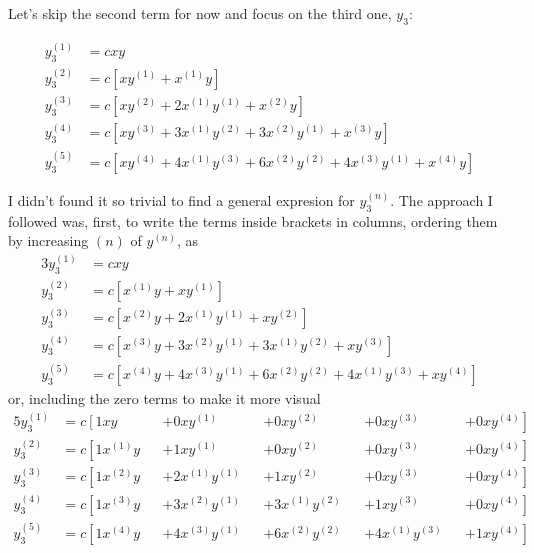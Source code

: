 \documentclass[12pt, a4paper]{article}
\begin{document}
Let's skip the second term for now and focus on the third one, $y_3$:

\begin{align*}
    y_3^{(1)} &= c x y \\
    y_3^{(2)} &= c \left[ x y^{(1)} + x^{(1)} y \right] \\
    y_3^{(3)} &= c \left[ x y^{(2)} + 2 x^{(1)} y^{(1)} + x^{(2)} y \right] \\
    y_3^{(4)} &= c \left[ x y^{(3)} + 3 x^{(1)} y^{(2)} + 3 x^{(2)} y^{(1)} + x^{(3)} y \right] \\
    y_3^{(5)} &= c \left[ x y^{(4)} + 4 x^{(1)} y^{(3)} + 6 x^{(2)} y^{(2)} + 4 x^{(3)} y^{(1)} + x^{(4)} y \right]
\end{align*}

I didn't found it so trivial to find a general expresion for $y_3^{(n)}$. The approach I followed was, first, to write the terms inside brackets in columns, ordering them by increasing $(n)$ of $y^{(n)}$, as
\begin{alignat*}{3}
    y_3^{(1)} &= c x y \\
    y_3^{(2)} &= c \left[ x^{(1)} y + x y^{(1)}  \right] \\
    y_3^{(3)} &= c \left[ x^{(2)} y + 2 x^{(1)} y^{(1)} + x y^{(2)}  \right] \\
    y_3^{(4)} &= c \left[ x^{(3)} y + 3 x^{(2)} y^{(1)} + 3 x^{(1)} y^{(2)} + x y^{(3)} \right] \\
    y_3^{(5)} &= c \left[ x^{(4)} y + 4 x^{(3)} y^{(1)} + 6 x^{(2)} y^{(2)} + 4 x^{(1)} y^{(3)} + x y^{(4)} \right]
\end{alignat*}
or, including the zero terms to make it more visual
\begin{alignat*}{5}
    y_3^{(1)} &= c \left[ 1 x y       \right. &&+ 0 x y^{(1)}       &&+ 0 x y^{(2)}       &&+ 0 x y^{(3)}       &&+ \left. 0 x y^{(4)} \right] \\
    y_3^{(2)} &= c \left[ 1 x^{(1)} y \right. &&+ 1 x y^{(1)}       &&+ 0 x y^{(2)}       &&+ 0 x y^{(3)}       &&+ \left. 0 x y^{(4)} \right] \\
    y_3^{(3)} &= c \left[ 1 x^{(2)} y \right. &&+ 2 x^{(1)} y^{(1)} &&+ 1 x y^{(2)}       &&+ 0 x y^{(3)}       &&+ \left. 0 x y^{(4)} \right] \\
    y_3^{(4)} &= c \left[ 1 x^{(3)} y \right. &&+ 3 x^{(2)} y^{(1)} &&+ 3 x^{(1)} y^{(2)} &&+ 1 x y^{(3)}       &&+ \left. 0 x y^{(4)} \right] \\
    y_3^{(5)} &= c \left[ 1 x^{(4)} y \right. &&+ 4 x^{(3)} y^{(1)} &&+ 6 x^{(2)} y^{(2)} &&+ 4 x^{(1)} y^{(3)} &&+ \left. 1 x y^{(4)} \right]
\end{alignat*}
\end{document}

